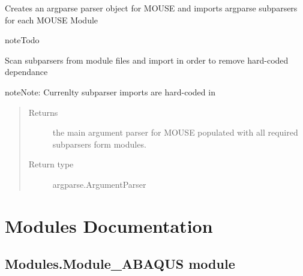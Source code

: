 \documentclass[letterpaper,10pt,english]{sphinxmanual}
\begin{document}
\begin{fulllineitems}
\label{\detokenize{MouseReferenceManual:MOUSE.createParser}}
Creates an argparse parser object for MOUSE and imports argparse subparsers for each MOUSE Module

\begin{sphinxadmonition}{note}{Todo}

Scan subparsers from module files and import in order to remove hard-coded dependance
\end{sphinxadmonition}

\begin{sphinxadmonition}{note}{Note:}
Currenlty subparser imports are hard-coded in
\end{sphinxadmonition}
\begin{quote}\begin{description}
\item[{Returns}] \leavevmode
the main argument parser for MOUSE populated with all required subparsers form modules.

\item[{Return type}] \leavevmode
argparse.ArgumentParser

\end{description}\end{quote}

\end{fulllineitems}



\section{Modules Documentation}
\label{\detokenize{MouseReferenceManual:modules-documentation}}

\subsection{Modules.Module\_ABAQUS module}
\label{\detokenize{MouseReferenceManual:modules-module-abaqus-module}}\label{\detokenize{MouseReferenceManual:module-Modules.Module_ABAQUS}}
\end{document}
